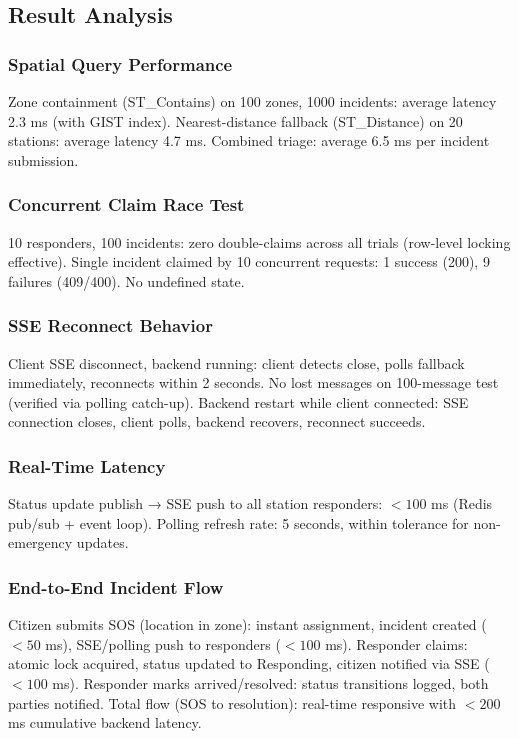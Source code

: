 \subsection{Result Analysis}

\subsubsection{Spatial Query Performance}

Zone containment (ST\_Contains) on 100 zones, 1000 incidents: average latency 2.3 ms (with GIST index). Nearest-distance fallback (ST\_Distance) on 20 stations: average latency 4.7 ms. Combined triage: average 6.5 ms per incident submission.

\subsubsection{Concurrent Claim Race Test}

10 responders, 100 incidents: zero double-claims across all trials (row-level locking effective). Single incident claimed by 10 concurrent requests: 1 success (200), 9 failures (409/400). No undefined state.

\subsubsection{SSE Reconnect Behavior}

Client SSE disconnect, backend running: client detects close, polls fallback immediately, reconnects within 2 seconds. No lost messages on 100-message test (verified via polling catch-up). Backend restart while client connected: SSE connection closes, client polls, backend recovers, reconnect succeeds.

\subsubsection{Real-Time Latency}

Status update publish → SSE push to all station responders: $< 100$ ms (Redis pub/sub + event loop). Polling refresh rate: 5 seconds, within tolerance for non-emergency updates.

\subsubsection{End-to-End Incident Flow}

Citizen submits SOS (location in zone): instant assignment, incident created ($< 50$ ms), SSE/polling push to responders ($< 100$ ms). Responder claims: atomic lock acquired, status updated to Responding, citizen notified via SSE ($< 100$ ms). Responder marks arrived/resolved: status transitions logged, both parties notified. Total flow (SOS to resolution): real-time responsive with $< 200$ ms cumulative backend latency.
